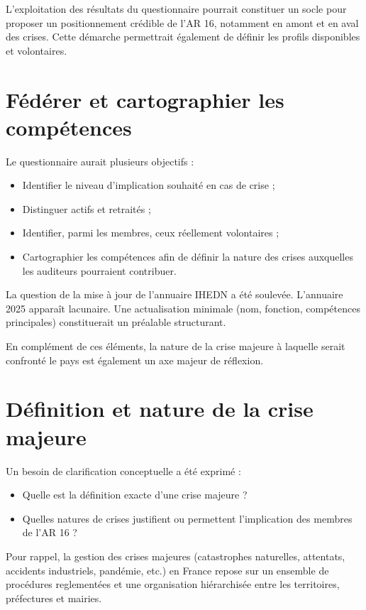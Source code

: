 \documentclass[12pt,a4paper]{article}
\begin{document}
L'exploitation des résultats du questionnaire pourrait constituer un socle pour proposer un positionnement crédible de l'AR 16, notamment en amont et en aval des crises.
Cette démarche permettrait également de définir les profils disponibles et volontaires.

\section*{Fédérer et cartographier les compétences}

Le questionnaire aurait plusieurs objectifs :
\begin{itemize}
    \item Identifier le niveau d'implication souhaité en cas de crise ;
    \item Distinguer actifs et retraités ;
    \item Identifier, parmi les membres, ceux réellement volontaires ;
    \item Cartographier les compétences afin de définir la nature des crises auxquelles les auditeurs pourraient contribuer.
\end{itemize}

La question de la mise à jour de l'annuaire IHEDN a été soulevée. L'annuaire 2025 apparaît lacunaire.  
Une actualisation minimale (nom, fonction, compétences principales) constituerait un préalable structurant.

En complément de ces éléments, la nature de la crise majeure à laquelle serait confronté le pays est également un axe majeur de réflexion.

\section*{Définition et nature de la crise majeure}

Un besoin de clarification conceptuelle a été exprimé : 
\begin{itemize}
    \item Quelle est la définition exacte d'une crise majeure ?
    \item Quelles natures de crises justifient ou permettent l'implication des membres de l'AR 16 ?
\end{itemize}

Pour rappel, la gestion des crises majeures (catastrophes naturelles, attentats, accidents industriels, pandémie, etc.) en France repose sur un ensemble de procédures reglementées et une organisation hiérarchisée entre les territoires, préfectures et mairies.
\end{document}
